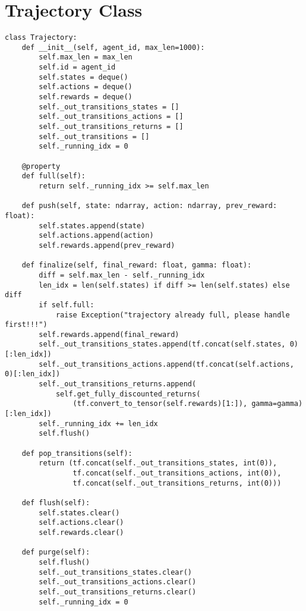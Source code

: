 \section{Trajectory Class}\label{appendix:code:trajectory}
\begin{lstlisting}[basicstyle=\footnotesize]
class Trajectory:
    def __init__(self, agent_id, max_len=1000):
        self.max_len = max_len
        self.id = agent_id
        self.states = deque()
        self.actions = deque()
        self.rewards = deque()
        self._out_transitions_states = []
        self._out_transitions_actions = []
        self._out_transitions_returns = []
        self._out_transitions = []
        self._running_idx = 0

    @property
    def full(self):
        return self._running_idx >= self.max_len

    def push(self, state: ndarray, action: ndarray, prev_reward: float): 
        self.states.append(state)
        self.actions.append(action)
        self.rewards.append(prev_reward)

    def finalize(self, final_reward: float, gamma: float):
        diff = self.max_len - self._running_idx
        len_idx = len(self.states) if diff >= len(self.states) else diff
        if self.full:
            raise Exception("trajectory already full, please handle first!!!")
        self.rewards.append(final_reward)
        self._out_transitions_states.append(tf.concat(self.states, 0)[:len_idx])
        self._out_transitions_actions.append(tf.concat(self.actions, 0)[:len_idx])
        self._out_transitions_returns.append(
            self.get_fully_discounted_returns(
                (tf.convert_to_tensor(self.rewards)[1:]), gamma=gamma)[:len_idx])
        self._running_idx += len_idx
        self.flush()

    def pop_transitions(self):
        return (tf.concat(self._out_transitions_states, int(0)),
                tf.concat(self._out_transitions_actions, int(0)),
                tf.concat(self._out_transitions_returns, int(0)))

    def flush(self): 
        self.states.clear()
        self.actions.clear()
        self.rewards.clear()

    def purge(self):
        self.flush()
        self._out_transitions_states.clear()
        self._out_transitions_actions.clear()
        self._out_transitions_returns.clear()
        self._running_idx = 0
\end{lstlisting}

